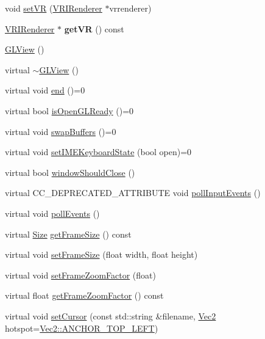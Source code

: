 \begin{DoxyCompactItemize}
\item 
void \hyperlink{classGLView_a28b947c83a97c1cbda8a34acadd62f7b}{set\+VR} (\hyperlink{classVRIRenderer}{V\+R\+I\+Renderer} $\ast$vrrenderer)
\item 
\mbox{\label{classGLView_abfb8445ea5472f4bafe886776df5e922}} 
\hyperlink{classVRIRenderer}{V\+R\+I\+Renderer} $\ast$ {\bfseries get\+VR} () const
\item 
\hyperlink{classGLView_a33f41548b6b0256c886ce75edf8015ce}{G\+L\+View} ()
\item 
virtual \hyperlink{classGLView_ad7def61cbd7d95ffac0f01de59ea58d6}{$\sim$\+G\+L\+View} ()
\item 
virtual void \hyperlink{classGLView_aaa284e08de7b4e530a2b15b1d27dced0}{end} ()=0
\item 
virtual bool \hyperlink{classGLView_a23326d6cbff86205a0d5fa953557838d}{is\+Open\+G\+L\+Ready} ()=0
\item 
virtual void \hyperlink{classGLView_a8868ba73f19216f5f6c8dbcc1a7c9bb4}{swap\+Buffers} ()=0
\item 
virtual void \hyperlink{classGLView_aaa70edad9dd4b2052237867db978e06d}{set\+I\+M\+E\+Keyboard\+State} (bool open)=0
\item 
virtual bool \hyperlink{classGLView_aa7a837484fd21d7c0a394e996963e84f}{window\+Should\+Close} ()
\item 
virtual C\+C\+\_\+\+D\+E\+P\+R\+E\+C\+A\+T\+E\+D\+\_\+\+A\+T\+T\+R\+I\+B\+U\+TE void \hyperlink{classGLView_ace980598802adb0f6c06b22525eeb062}{poll\+Input\+Events} ()
\item 
virtual void \hyperlink{classGLView_a5e5a3b7fd25698d24df6c53f617fefdf}{poll\+Events} ()
\item 
virtual \hyperlink{classSize}{Size} \hyperlink{classGLView_a799a1769901a6bbd707457746e8d3763}{get\+Frame\+Size} () const
\item 
virtual void \hyperlink{classGLView_a9d6aa2c05e70f0b748049c0c057ff603}{set\+Frame\+Size} (float width, float height)
\item 
virtual void \hyperlink{classGLView_a1e9bc3b630d2225332656cf385ac7b2c}{set\+Frame\+Zoom\+Factor} (float)
\item 
virtual float \hyperlink{classGLView_ab804d7568f68b8d91cf420d1c0057f38}{get\+Frame\+Zoom\+Factor} () const
\item 
virtual void \hyperlink{classGLView_ab9defa8d2bbfb495da622958e2f9a500}{set\+Cursor} (const std\+::string \&filename, \hyperlink{classVec2}{Vec2} hotspot=\hyperlink{classVec2_ab0533215e446e0381d01bf49edd7ab7c}{Vec2\+::\+A\+N\+C\+H\+O\+R\+\_\+\+T\+O\+P\+\_\+\+L\+E\+FT})

\end{DoxyCompactItemize}
